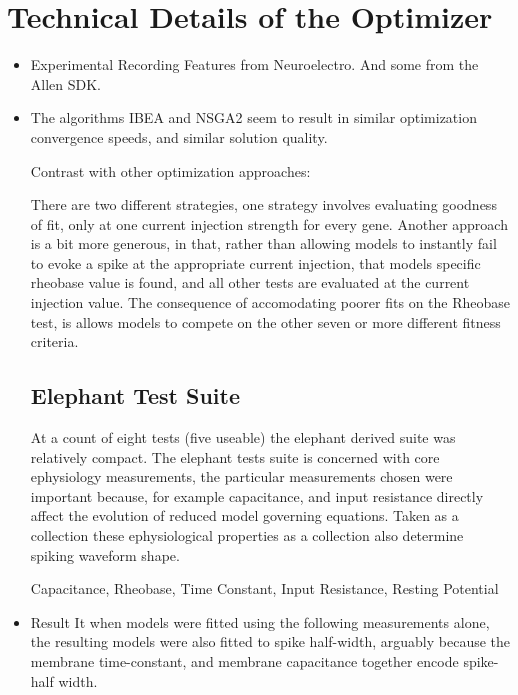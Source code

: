 \section*{Technical Details of the Optimizer}
\begin{itemize}

\item Experimental Recording Features from Neuroelectro. And some from the Allen SDK.
\item The algorithms IBEA and NSGA2 seem to result in similar optimization convergence speeds, and similar solution quality.



Contrast with other optimization approaches:


There are two different strategies, one strategy involves evaluating goodness of fit, only at one current injection strength for every gene. Another approach is a bit more generous, in that, rather than allowing models to instantly fail to evoke a spike at the appropriate current injection, that models specific rheobase value is found, and all other tests are evaluated at the current injection value. The consequence of accomodating poorer fits on the Rheobase test, is allows models to compete on the other seven or more different fitness criteria.

\subsection{Elephant Test Suite}
At a count of eight tests (five useable) the elephant derived suite was relatively compact. The elephant tests suite is concerned with core ephysiology measurements, the particular measurements chosen were important because, for example capacitance, and input resistance directly affect the evolution of reduced model governing equations. Taken as a collection these ephysiological properties as a collection also determine spiking waveform shape. 

Capacitance, Rheobase, Time Constant, Input Resistance, Resting Potential

\item Result It when models were fitted using the following measurements alone, the resulting models were also fitted to spike half-width, arguably because the membrane time-constant, and membrane capacitance together encode spike-half width.


\end{itemize}
